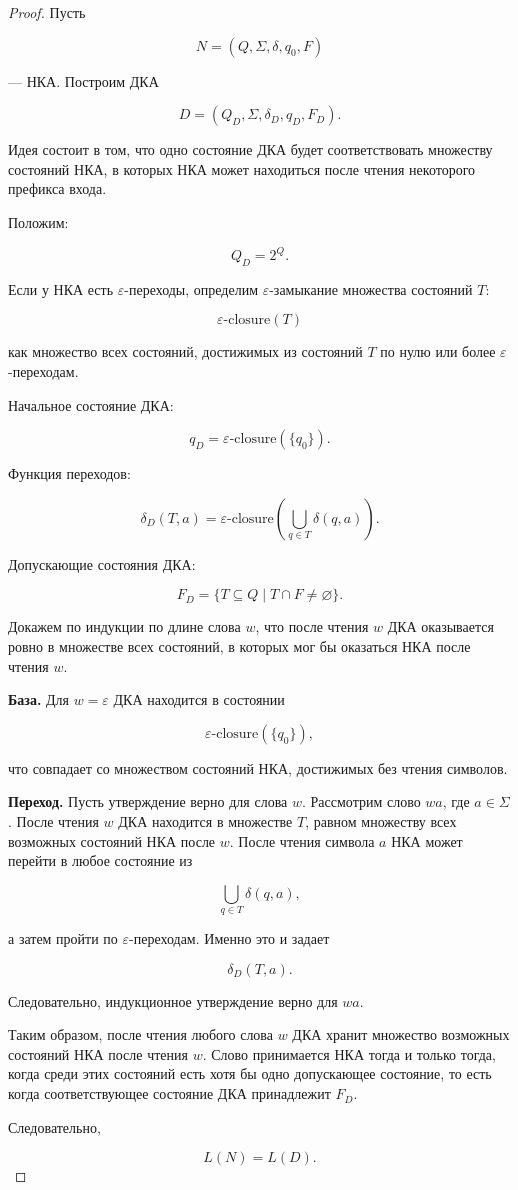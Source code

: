 \documentclass[12pt,a4paper]{article}
\begin{document}
\begin{proof}
Пусть

\[
N = (Q,\Sigma,\delta,q_0,F)
\]

--- НКА. Построим ДКА

\[
D = (Q_D,\Sigma,\delta_D,q_D,F_D).
\]

Идея состоит в том, что одно состояние ДКА будет соответствовать множеству состояний НКА, в которых НКА может находиться после чтения некоторого префикса входа.

Положим:

\[
Q_D = 2^Q.
\]

Если у НКА есть $\varepsilon$-переходы, определим $\varepsilon$-замыкание множества состояний $T$:

\[
\varepsilon\text{-closure}(T)
\]

как множество всех состояний, достижимых из состояний $T$ по нулю или более $\varepsilon$-переходам.

Начальное состояние ДКА:

\[
q_D = \varepsilon\text{-closure}(\{q_0\}).
\]

Функция переходов:

\[
\delta_D(T,a)
=
\varepsilon\text{-closure}
\left(
\bigcup_{q \in T} \delta(q,a)
\right).
\]

Допускающие состояния ДКА:

\[
F_D = \{T \subseteq Q \mid T \cap F \ne \varnothing\}.
\]

Докажем по индукции по длине слова $w$, что после чтения $w$ ДКА оказывается ровно в множестве всех состояний, в которых мог бы оказаться НКА после чтения $w$.

\textbf{База.} Для $w=\varepsilon$ ДКА находится в состоянии

\[
\varepsilon\text{-closure}(\{q_0\}),
\]

что совпадает со множеством состояний НКА, достижимых без чтения символов.

\textbf{Переход.} Пусть утверждение верно для слова $w$. Рассмотрим слово $wa$, где $a \in \Sigma$. После чтения $w$ ДКА находится в множестве $T$, равном множеству всех возможных состояний НКА после $w$. После чтения символа $a$ НКА может перейти в любое состояние из

\[
\bigcup_{q \in T}\delta(q,a),
\]

а затем пройти по $\varepsilon$-переходам. Именно это и задает

\[
\delta_D(T,a).
\]

Следовательно, индукционное утверждение верно для $wa$.

Таким образом, после чтения любого слова $w$ ДКА хранит множество возможных состояний НКА после чтения $w$. Слово принимается НКА тогда и только тогда, когда среди этих состояний есть хотя бы одно допускающее состояние, то есть когда соответствующее состояние ДКА принадлежит $F_D$.

Следовательно,

\[
L(N)=L(D).
\]
\end{proof}
\end{document}
